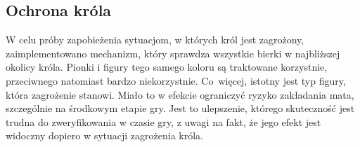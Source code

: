 \subsection{Ochrona króla}
\label{subsec:ochrona-krola}

W celu próby zapobieżenia sytuacjom, w których król jest zagrożony, zaimplementowano mechanizm, który sprawdza wszystkie bierki w najbliższej okolicy króla.
Pionki i figury tego samego koloru są traktowane korzystnie, przeciwnego natomiast bardzo niekorzystnie.
Co~więcej, istotny jest typ figury, która zagrożenie stanowi.
Miało to w efekcie ograniczyć ryzyko zakładania mata, szczególnie na środkowym etapie gry.
Jest to ulepszenie, którego skuteczność jest trudna do zweryfikowania w czasie gry, z uwagi na fakt, że jego efekt jest widoczny dopiero w sytuacji zagrożenia króla.

